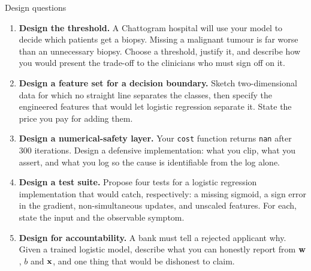 \documentclass[aspectratio=169,10pt]{beamer}
\begin{document}
\begin{frame}{Design questions}
  \footnotesize
  \begin{enumerate}
    \item \textbf{Design the threshold.} A Chattogram hospital will use your model to decide
          which patients get a biopsy. Missing a malignant tumour is far worse than an
          unnecessary biopsy. Choose a threshold, justify it, and describe how you would
          present the trade-off to the clinicians who must sign off on it. \hfill{}
    \item \textbf{Design a feature set for a decision boundary.} Sketch two-dimensional data
          for which no straight line separates the classes, then specify the engineered
          features that would let logistic regression separate it. State the price you pay
          for adding them. \hfill{}
    \item \textbf{Design a numerical-safety layer.} Your \texttt{cost} function returns
          \texttt{nan} after 300 iterations. Design a defensive implementation: what you clip,
          what you assert, and what you log so the cause is identifiable from the log alone.
          \hfill{}
    \item \textbf{Design a test suite.} Propose four tests for a logistic regression
          implementation that would catch, respectively: a missing sigmoid, a sign error in
          the gradient, non-simultaneous updates, and unscaled features. For each, state the
          input and the observable symptom. \hfill{}
    \item \textbf{Design for accountability.} A bank must tell a rejected applicant why. Given
          a trained logistic model, describe what you can honestly report from $\mathbf{w}$, $b$ and
          $\mathbf{x}$, and one thing that would be dishonest to claim. \hfill{}
  \end{enumerate}
\end{frame}
\end{document}
